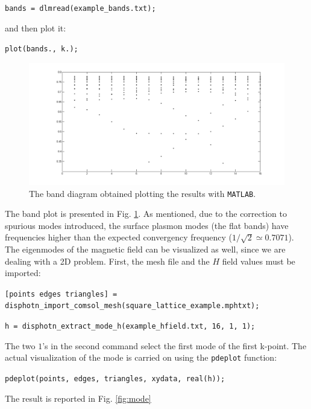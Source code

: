 \documentclass[11pt,a4paper,oneside]{article}
\begin{document}
{\tt bands = dlmread(example\_bands.txt);}

\noindent
and then plot it:

{\tt plot(bands.,\ k.);}

\begin{figure}
\begin{center}
\includegraphics[width=\textwidth]{bands.png}
\caption{\label{fig:bands} The band diagram obtained plotting the results with {\tt MATLAB}.}
\end{center}
\end{figure}

The band plot is presented in Fig. \ref{fig:bands}. As mentioned, due to the correction to spurious modes introduced, the surface plasmon modes (the flat bands) have frequencies higher than the expected convergency frequency ($1/\sqrt{2} \simeq 0.7071$).
The eigenmodes of the magnetic field can be visualized as well, since we are dealing with a 2D problem. First, the mesh file and the $H$ field values must be imported:

{\tt [points\ edges\ triangles] =  disphotn\_import\_comsol\_mesh(square\_lattice\_example.mphtxt);} 


{\tt h = disphotn\_extract\_mode\_h(example\_hfield.txt, 16, 1, 1);}

\noindent
The two $1$'s in the second command select the first mode of the first k-point. The actual visualization of the mode is carried on using the {\tt pdeplot} function:

{\tt pdeplot(points,\ edges,\ triangles,\ xydata,\ real(h));}

\noindent
The result is reported in Fig. \ref{fig:mode}
\end{document}
